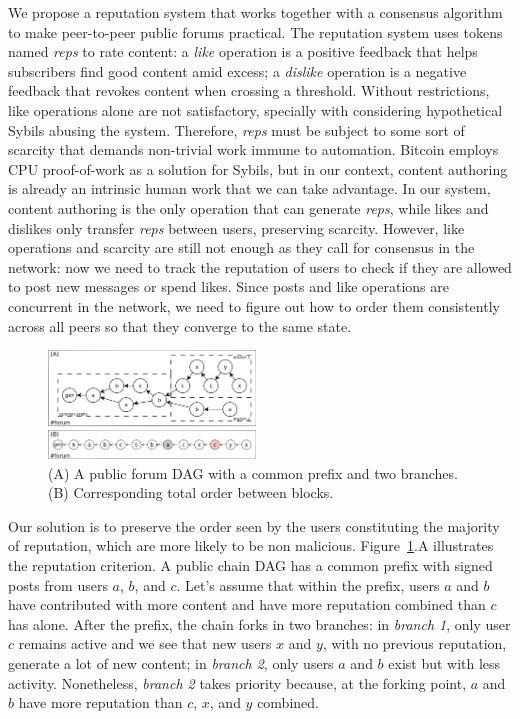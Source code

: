 \documentclass[10pt,journal,compsoc]{IEEEtran}
\newcommand{\reps}      {\emph{reps}\xspace}
\begin{document}
We propose a reputation system that works together with a consensus algorithm
to make peer-to-peer public forums practical.
%
The reputation system uses tokens named \reps to rate content:
a \emph{like} operation is a positive feedback that helps subscribers find good
content amid excess;
a \emph{dislike} operation is a negative feedback that revokes content when
crossing a threshold.
%
Without restrictions, like operations alone are not satisfactory, specially
with considering hypothetical Sybils abusing the system.
Therefore, \reps must be subject to some sort of scarcity that demands
non-trivial work immune to automation.
Bitcoin employs CPU proof-of-work as a solution for Sybils, but in our context,
content authoring is already an intrinsic human work that we can take
advantage.
In our system, content authoring is the only operation that can generate \reps,
while likes and dislikes only transfer \reps between users, preserving
scarcity.
%
However, like operations and scarcity are still not enough as they call for
consensus in the network: now we need to track the reputation of users to check
if they are allowed to post new messages or spend likes.
Since posts and like operations are concurrent in the network, we need to
figure out how to order them consistently across all peers so that they
converge to the same state.

\begin{figure}[t]
\centering
\includegraphics[width=0.49\textwidth]{reps2.png}
\caption{
    (A) A public forum DAG with a common prefix and two branches.
    (B) Corresponding total order between blocks.
}
\label{fig.reps}
\end{figure}

Our solution is to preserve the order seen by the users constituting the
majority of reputation, which are more likely to be non malicious.
%
Figure~\ref{fig.reps}.A illustrates the reputation criterion.
A public chain DAG has a common prefix with signed posts from users $a$, $b$,
and $c$.
Let's assume that within the prefix, users $a$ and $b$ have contributed with
more content and have more reputation combined than $c$ has alone.
%
After the prefix, the chain forks in two branches:
in \emph{branch 1}, only user $c$ remains active and we see that new users $x$
and $y$, with no previous reputation, generate a lot of new content;
in \emph{branch 2}, only users $a$ and $b$ exist but with less activity.
Nonetheless, \emph{branch 2} takes priority because, at the forking point, $a$
and $b$ have more reputation than $c$, $x$, and $y$ combined.
\end{document}
